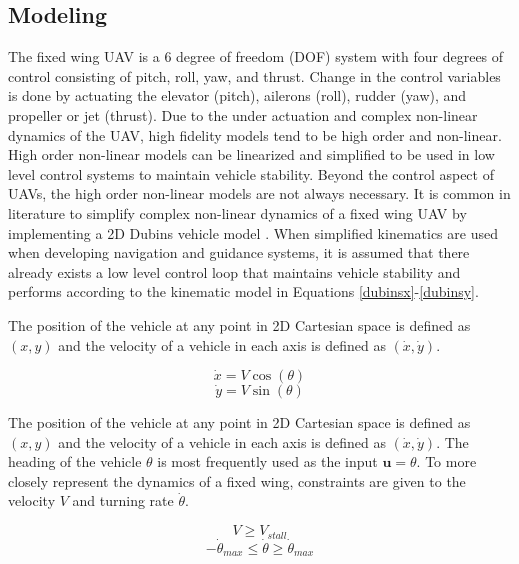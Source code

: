 \documentclass[numbered,pdftex]{ohio-etd}
\begin{document}
\subsection{Modeling}
The fixed wing UAV is a 6 degree of freedom (DOF) system with four degrees of control consisting of pitch, roll, yaw, and thrust. Change in the control variables is done by actuating the elevator (pitch), ailerons (roll), rudder (yaw), and propeller or jet (thrust). Due to the under actuation and complex non-linear dynamics of the UAV, high fidelity models tend to be high order and non-linear. High order non-linear models can be linearized and simplified to be used in low level control systems to maintain vehicle stability. Beyond the control aspect of UAVs, the high order non-linear models are not always necessary. It is common in literature to simplify complex non-linear dynamics of a fixed wing UAV by implementing a 2D Dubins vehicle model \cite{chen_tracking_2009} \cite{liang_tangent_2017} \cite{nelson_cooperative_2005} \cite{griffiths_vector_2006} \cite{jung_unmanned_2016}. When simplified kinematics are used when developing navigation and guidance systems, it is assumed that there already exists a low level control loop that maintains vehicle stability and performs according to the kinematic model in Equations \ref{dubinsx}-\ref{dubinsy}. 


The position of the vehicle at any point in 2D Cartesian space is defined as $(x,y)$ and the velocity of a vehicle in each axis is defined as $(\dot{x},\dot{y})$.

\begin{equation}
\label{dubinsx}
\dot{x} = V\cos(\theta)
\end{equation}
\begin{equation}
\label{dubinsy}
\dot{y} = V\sin(\theta)
\end{equation}


The position of the vehicle at any point in 2D Cartesian space is defined as $(x,y)$ and the velocity of a vehicle in each axis is defined as $(\dot{x},\dot{y})$. The heading of the vehicle $\theta$ is most frequently used as the input $\boldsymbol{u} = \theta$. To more closely represent the dynamics of a fixed wing, constraints are given to the velocity $V$ and turning rate $\dot{\theta}$. 



\begin{equation}\label{minVel}
V \geq V_{stall}
\end{equation}
\begin{equation}\label{headingRate}
-\dot{\theta}_{max} \leq \dot{\theta} \geq \dot{\theta}_{max}
\end{equation}
\end{document}
